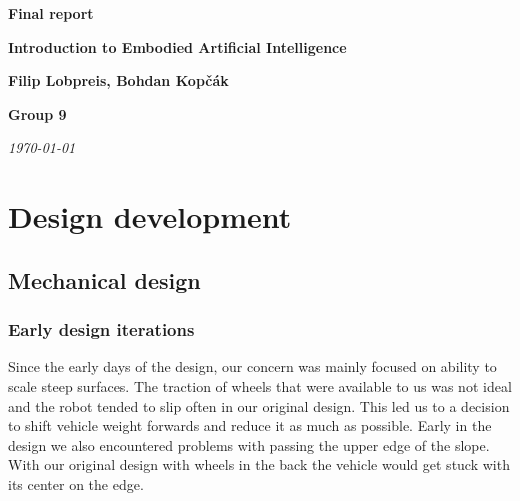 \documentclass{article}
\date{\today} %
\begin{document}
\begin{center}
	\vspace*{\fill}
	\Huge\textbf{Final report}\par
	\vspace{0.2cm}
	\Large\textbf{Introduction to Embodied Artificial Intelligence}\par
	\vspace{2cm}
	\large\textbf{Filip Lobpreis, Bohdan Kopčák}\par
	\vspace{0.2cm}
	\large\textbf{Group 9}\par
	\vspace{1cm}
	\large\textit{\today}\par
	\vspace*{\fill}
\end{center}

\section{Design development}
\label{sec:development}

\subsection{Mechanical design}
\label{subsec:mechanical_design}

\subsubsection{Early design iterations}

Since the early days of the design, our concern was mainly focused on ability to scale steep surfaces. The traction of
wheels that were available to us was not ideal and the robot tended to slip often in our original design. This led us
to a decision to shift vehicle weight forwards and reduce it as much as possible. Early in the design we also
encountered problems with passing the upper edge of the slope. With our original design with wheels in the back
the vehicle would get stuck with its center on the edge.
\end{document}
